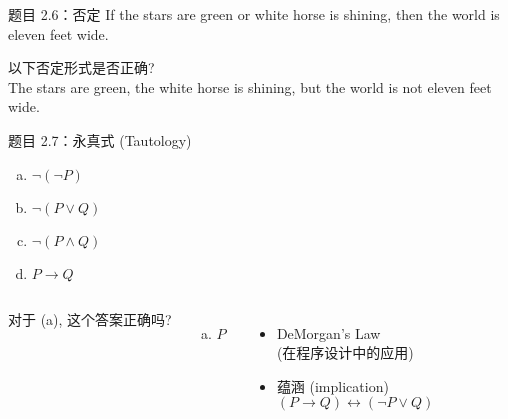 \begin{frame}{}
  \begin{exampleblock}{题目 2.6：否定}
    If the stars are green or white horse is shining,
    then the world is eleven feet wide.
  \end{exampleblock}

  \vspace{0.50cm}

  以下否定形式是否正确?\\[8pt]

  The stars are green, the white horse is shining, but the world is not eleven feet wide.
\end{frame}

\begin{frame}{}
  \begin{exampleblock}{题目 2.7：永真式 (Tautology)}
    \begin{enumerate}[(a)]
      \item $\lnot(\lnot P)$
      \item $\lnot(P \lor Q)$
      \item $\lnot(P \land Q)$
      \item $P \to Q$
    \end{enumerate}
  \end{exampleblock}

  \vspace{0.30cm}
  \begin{columns}
      对于 (a), 这个答案正确吗?
      \begin{enumerate}[(a)]
	\item $P$
      \end{enumerate}
    \pause
      \begin{itemize}
	\item DeMorgan's Law \\
	  (在程序设计中的应用)
	\item 蕴涵 (implication)
	  \[
	    (P \to Q) \leftrightarrow (\lnot P \lor Q)
	  \]
      \end{itemize}
  \end{columns}

\end{frame}

